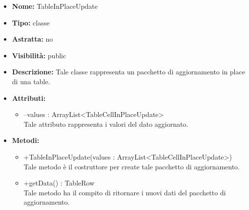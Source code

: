 	
			
			\begin{itemize}
			\item \textbf{Nome:} TableInPlaceUpdate
			\item \textbf{Tipo:} classe
			
		\item \textbf{Astratta:}
		no
			\item \textbf{Visibilità:} public
			\item \textbf{Descrizione:} Tale classe rappresenta un pacchetto di aggiornamento in place di una table.
			\item \textbf{Attributi:}
				\begin{itemize}
				\setlength{\itemsep}{5pt}
				
					\item[\ding{111}] {--values : ArrayList<TableCellInPlaceUpdate>} \\ [1mm] Tale attributo rappresenta i valori del dato aggiornato.
				\end{itemize}
		
			\item \textbf{Metodi:}
				\begin{itemize}
				\setlength{\itemsep}{5pt}
				
					\item[\ding{111}] {{+TableInPlaceUpdate(values : ArrayList<TableCellInPlaceUpdate>)}} \\ [1mm] Tale metodo è il costruttore per create tale pacchetto di aggiornamento.
					\item[\ding{111}] {{+getData() : TableRow}} \\ [1mm] Tale metodo ha il compito di ritornare i nuovi dati del pacchetto di aggiornamento.
				\end{itemize}
		
			\end{itemize}
	
